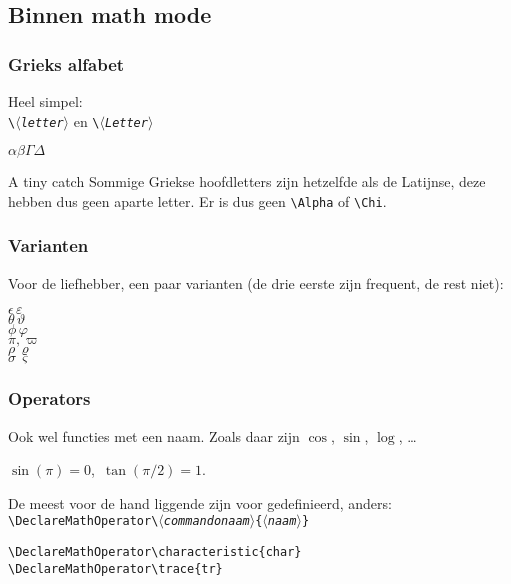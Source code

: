 \subsection{Binnen math mode}
\begin{frame}[fragile]
  \frametitle{Grieks alfabet}

  Heel simpel:\\
  \texttt{\textbackslash$\langle$\textsl{letter}$\rangle$} en \texttt{\textbackslash$\langle$\textsl{Letter}$\rangle$}

  \begin{LTXexample}
$\alpha\beta\Gamma\Delta$
  \end{LTXexample}

  \begin{alertblock}{A tiny catch}
    Sommige Griekse hoofdletters zijn hetzelfde als de Latijnse, deze hebben dus geen aparte letter. Er is dus geen \verb|\Alpha| of \verb|\Chi|.
  \end{alertblock}
\end{frame}

\begin{frame}[fragile]
  \frametitle{Varianten}

  Voor de liefhebber, een paar varianten (de drie eerste zijn frequent, de rest niet):

  \begin{LTXexample}
$\epsilon\,\varepsilon$ \\
$\theta\,\vartheta$ \\
$\phi\,\varphi$ \\
$\pi,\varpi$ \\
$\rho\,\varrho$ \\
$\sigma\,\varsigma$
  \end{LTXexample}
\end{frame}

\begin{frame}[fragile]
  \frametitle{Operators}

  Ook wel functies met een naam. Zoals daar zijn $\cos$, $\sin$, $\log$, \ldots

  \begin{LTXexample}
$\sin(\pi)=0$,~$\tan(\pi/2)=1$.
  \end{LTXexample}

  De meest voor de hand liggende zijn voor gedefinieerd, anders: \\
  \texttt{\textbackslash DeclareMathOperator\textbackslash\textsl{$\langle$commandonaam$\rangle$}\{\textsl{$\langle$naam$\rangle$}\}}
  \begin{verbatim}
\DeclareMathOperator\characteristic{char}
\DeclareMathOperator\trace{tr}
\end{verbatim}
\end{frame}

